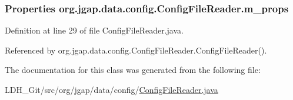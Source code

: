 \hypertarget{classorg_1_1jgap_1_1data_1_1config_1_1_config_file_reader_af8dfcbd537624adbb3c1caa718ba0f5f}{
\subsubsection[{m\-\_\-props}]{\setlength{\rightskip}{0pt plus 5cm}Properties org.\-jgap.\-data.\-config.\-Config\-File\-Reader.\-m\-\_\-props\hspace{0.3cm}{\ttfamily [private]}}}\label{classorg_1_1jgap_1_1data_1_1config_1_1_config_file_reader_af8dfcbd537624adbb3c1caa718ba0f5f}


Definition at line 29 of file Config\-File\-Reader.\-java.



Referenced by org.\-jgap.\-data.\-config.\-Config\-File\-Reader.\-Config\-File\-Reader().



The documentation for this class was generated from the following file\-:\begin{DoxyCompactItemize}
\item 
L\-D\-H\-\_\-\-Git/src/org/jgap/data/config/\hyperlink{_config_file_reader_8java}{Config\-File\-Reader.\-java}\end{DoxyCompactItemize}
